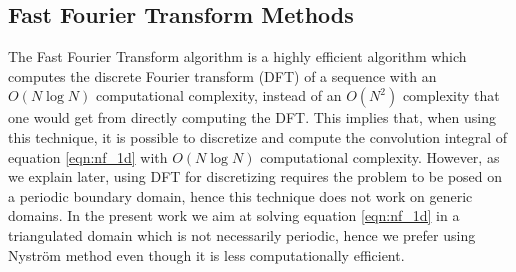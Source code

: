 \documentclass{uonmathreport}
\begin{document}
\subsection{Fast Fourier Transform Methods}
\label{subsec:fft}
The Fast Fourier Transform algorithm is a highly efficient algorithm which computes the discrete Fourier transform (DFT) of a sequence with an $O(N\log N)$ computational complexity, instead of an $O(N^2)$ complexity that one would get from directly computing the DFT. This implies that, when using this technique, it is possible to discretize and compute the convolution integral of equation \ref{eqn:nf_1d} with $O(N \log N)$ computational complexity. However, as we explain later, using DFT for discretizing requires the problem to be posed on a periodic boundary domain, hence this technique does not work on generic domains. In the present work we aim at solving equation \ref{eqn:nf_1d} in a triangulated domain which is not necessarily periodic, hence we prefer using Nystr\"om method even though it is less computationally efficient.
\end{document}
